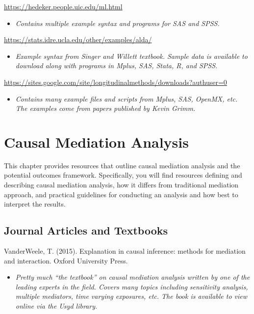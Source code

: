 \documentclass[
]{book}
\providecommand{\tightlist}{%
  \setlength{\itemsep}{0pt}\setlength{\parskip}{0pt}}
\begin{document}
\url{https://hedeker.people.uic.edu/ml.html}

\begin{itemize}
\tightlist
\item
  \emph{Contains multiple example syntax and programs for SAS and SPSS.}
\end{itemize}

\url{https://stats.idre.ucla.edu/other/examples/alda/}

\begin{itemize}
\tightlist
\item
  \emph{Example syntax from Singer and Willett textbook. Sample data is available to download along with programs in Mplus, SAS, Stata, R, and SPSS. }
\end{itemize}

\url{https://sites.google.com/site/longitudinalmethods/downloads?authuser=0}

\begin{itemize}
\tightlist
\item
  \emph{Contains many example files and scripts from Mplus, SAS, OpenMX, etc. The examples come from papers published by Kevin Grimm.}
\end{itemize}

\chapter{Causal Mediation Analysis}\label{causal-mediation-analysis}

This chapter provides resources that outline causal mediation analysis and the potential outcomes framework. Specifically, you will find resources defining and describing causal mediation analysis, how it differs from traditional mediation approach, and practical guidelines for conducting an analysis and how best to interpret the results.

\section{Journal Articles and Textbooks}\label{journal-articles-and-textbooks-3}

VanderWeele, T. (2015). Explanation in causal inference: methods for mediation and interaction. Oxford University Press.

\begin{itemize}
\tightlist
\item
  \emph{Pretty much ``the textbook'' on causal mediation analysis written by one of the leading experts in the field. Covers many topics including sensitivity analysis, multiple mediators, time varying exposures, etc. The book is available to view online via the Usyd library. }
\end{itemize}
\end{document}
